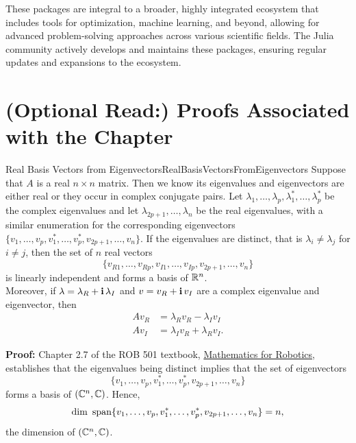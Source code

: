 These packages are integral to a broader, highly integrated ecosystem that includes tools for optimization, machine learning, and beyond, allowing for advanced problem-solving approaches across various scientific fields. The Julia community actively develops and maintains these packages, ensuring regular updates and expansions to the ecosystem.



\section{(Optional Read:) Proofs Associated with the Chapter}
\label{sec:ODEproofs}


\begin{propColor}{Real Basis Vectors from Eigenvectors}{RealBasisVectorsFromEigenvectors}
Suppose that $A$ is a real $n \times n$ matrix. Then we know its eigenvalues and eigenvectors are either real or they occur in complex conjugate pairs. Let $\lambda_1, \ldots, \lambda_p, \lambda_1^\ast, \ldots, \lambda_p^\ast$ be the complex eigenvalues and let $\lambda_{2p+1}, \ldots, \lambda_n$ be the real eigenvalues, with a similar enumeration for the corresponding eigenvectors $\{v_1, \ldots, v_p, v_1^\ast, \ldots, v_p^\ast, v_{2p+1}, \ldots, v_n\}$. If the eigenvalues are distinct, that is $\lambda_i \neq \lambda_j$ for $i \neq j$, then the set of $n$ real vectors
$$ \{ v_{R1}, \ldots, v_{Rp},v_{I1}, \ldots, v_{Ip} , v_{2p+1}, \ldots, v_n \} $$
is linearly independent and forms a basis of $\mathbb R^n$. \\

Moreover, if $\lambda=\lambda_R + \mathop{\bm{\mathrm i}} \lambda_I$ and $v = v_R + \mathop{\bm{\mathrm i}} v_I$ are a complex eigenvalue and eigenvector, then
\begin{equation}
\label{eq:KeyToRealJordanForm}
    \begin{aligned}
        A v_R &= \lambda_R v_R -  \lambda_I v_I \\
        A v_I &= \lambda_I v_R +  \lambda_R v_I.
    \end{aligned}
\end{equation}
    
\end{propColor}

\textbf{Proof:} Chapter 2.7 of the ROB 501 textbook, \href{https://www.dropbox.com/scl/fi/5c656kxxzzwd1s6lgb6x7/ROB501_Textbook2022_03_21.pdf?rlkey=frdzx71ddh988vzvmd2izhd5y&dl=0}{Mathematics for Robotics}, establishes that the eigenvalues being distinct implies that the set of eigenvectors
$$ \{v_1, \ldots, v_p, v_1^\ast, \ldots, v_p^\ast, v_{2p+1}, \ldots, v_n\}$$
forms a basis of $(\mathbb C^n, \mathbb C)$. Hence, 
$$ \dim ~ \mathrm{span} \{ v_1, \ldots, v_p, v_1^\ast, \ldots, v_p^\ast, v_{2p+1}, \ldots, v_n \} = n,$$
the dimension of $(\mathbb C^n, \mathbb C)$.\\

